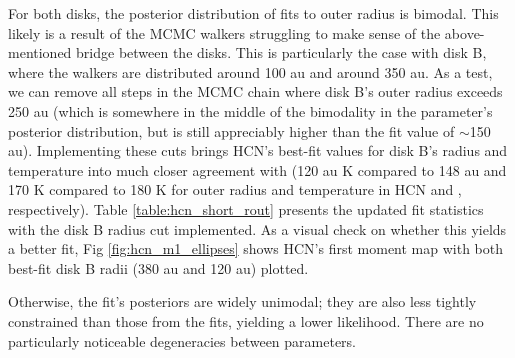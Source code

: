 For both disks, the posterior distribution of fits to outer radius is bimodal. This likely is a result of the MCMC walkers struggling to make sense of the above-mentioned bridge between the disks. This is particularly the case with disk B, where the walkers are distributed around 100 au and around 350 au. As a test, we can remove all steps in the MCMC chain where disk B's outer radius exceeds 250 au (which is somewhere in the middle of the bimodality in the parameter's posterior distribution, but is still appreciably higher than the \hco fit value of $\sim$150 au). Implementing these cuts brings HCN's best-fit values for disk B's radius and temperature into much closer agreement with \hco (120 au K compared to 148 au and 170 K compared to 180 K for outer radius and temperature in HCN and \hco, respectively). Table \ref{table:hcn_short_rout} presents the updated fit statistics with the disk B radius cut implemented. As a visual check on whether this yields a better fit, Fig \ref{fig:hcn_m1_ellipses} shows HCN's first moment map with both best-fit disk B radii (380 au and 120 au) plotted.

Otherwise, the fit's posteriors are widely unimodal; they are also less tightly constrained than those from the \hco fits, yielding a lower likelihood. There are no particularly noticeable degeneracies between parameters.



